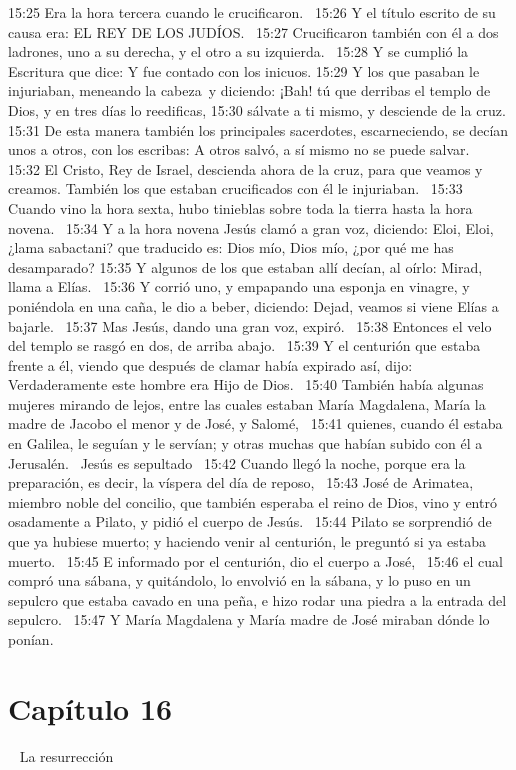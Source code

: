 15:25 Era la hora tercera cuando le crucificaron.  
15:26 Y el título escrito de su causa era: EL REY DE LOS JUDÍOS.  
15:27 Crucificaron también con él a dos ladrones, uno a su derecha, y el otro a su izquierda.  
15:28 Y se cumplió la Escritura que dice: Y fue contado con los inicuos. 
15:29 Y los que pasaban le injuriaban, meneando la cabeza y diciendo: ¡Bah! tú que derribas el templo de Dios, y en tres días lo reedificas, 
15:30 sálvate a ti mismo, y desciende de la cruz. 
15:31 De esta manera también los principales sacerdotes, escarneciendo, se decían unos a otros, con los escribas: A otros salvó, a sí mismo no se puede salvar.  
15:32 El Cristo, Rey de Israel, descienda ahora de la cruz, para que veamos y creamos. También los que estaban crucificados con él le injuriaban.  
15:33 Cuando vino la hora sexta, hubo tinieblas sobre toda la tierra hasta la hora novena.  
15:34 Y a la hora novena Jesús clamó a gran voz, diciendo: Eloi, Eloi, ¿lama sabactani? que traducido es: Dios mío, Dios mío, ¿por qué me has desamparado? 
15:35 Y algunos de los que estaban allí decían, al oírlo: Mirad, llama a Elías.  
15:36 Y corrió uno, y empapando una esponja en vinagre, y poniéndola en una caña, le dio a beber, diciendo: Dejad, veamos si viene Elías a bajarle.  
15:37 Mas Jesús, dando una gran voz, expiró.  
15:38 Entonces el velo del templo se rasgó en dos, de arriba abajo.  
15:39 Y el centurión que estaba frente a él, viendo que después de clamar había expirado así, dijo: Verdaderamente este hombre era Hijo de Dios.  
15:40 También había algunas mujeres mirando de lejos, entre las cuales estaban María Magdalena, María la madre de Jacobo el menor y de José, y Salomé,  
15:41 quienes, cuando él estaba en Galilea, le seguían y le servían; y otras muchas que habían subido con él a Jerusalén.  
Jesús es sepultado   
15:42 Cuando llegó la noche, porque era la preparación, es decir, la víspera del día de reposo,  
15:43 José de Arimatea, miembro noble del concilio, que también esperaba el reino de Dios, vino y entró osadamente a Pilato, y pidió el cuerpo de Jesús.  
15:44 Pilato se sorprendió de que ya hubiese muerto; y haciendo venir al centurión, le preguntó si ya estaba muerto.  
15:45 E informado por el centurión, dio el cuerpo a José,  
15:46 el cual compró una sábana, y quitándolo, lo envolvió en la sábana, y lo puso en un sepulcro que estaba cavado en una peña, e hizo rodar una piedra a la entrada del sepulcro.  
15:47 Y María Magdalena y María madre de José miraban dónde lo ponían.  
\section*{Capítulo 16} 
La resurrección   

